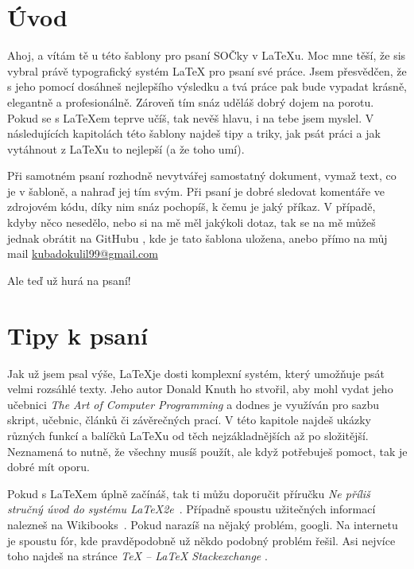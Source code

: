\documentclass[12pt, a4paper,
    twoside,        %
    openright
]{report}
\begin{document}
\pagestyle{fancy}
\setcounter{page}{1}

\chapter*{Úvod}
Ahoj,
a vítám tě u této šablony pro psaní SOČky v \LaTeX u. Moc mne těší, že sis vybral právě typografický systém \LaTeX{ }pro psaní své práce. Jsem přesvědčen, že s jeho pomocí dosáhneš nejlepšího výsledku a tvá práce pak bude vypadat krásně, elegantně a profesionálně. Zároveň tím snáz uděláš dobrý dojem na porotu. Pokud se s \LaTeX em teprve učíš, tak nevěš hlavu, i na tebe jsem myslel. V následujících kapitolách této šablony najdeš tipy a triky, jak psát práci a jak vytáhnout z \LaTeX u to nejlepší (a že toho umí).

Při samotném psaní rozhodně nevytvářej samostatný dokument, vymaž text, co je v šabloně, a nahraď jej tím svým. Při psaní je dobré sledovat komentáře ve zdrojovém kódu, díky nim snáz pochopíš, k čemu je jaký příkaz. V případě, kdyby něco nesedělo, nebo si na mě měl jakýkoli dotaz, tak se na mě můžeš jednak obrátit na GitHubu \cite{sablonaSOC}, kde je tato šablona uložena, anebo přímo na můj mail \url{kubadokulil99@gmail.com} %

Ale teď už hurá na psaní!

\chapter{Tipy k psaní}

Jak už jsem psal výše, \LaTeX je dosti komplexní systém, který umožňuje psát velmi rozsáhlé texty. Jeho autor Donald Knuth ho stvořil, aby mohl vydat jeho učebnici \emph{The Art of Computer Programming} a dodnes je využíván pro sazbu skript, učebnic, článků či závěrečných prací. V této kapitole najdeš ukázky různých funkcí a balíčků \LaTeX u od těch nejzákladnějších až po složitější. Neznamená to nutně, že všechny musíš použít, ale když potřebuješ pomoct, tak je dobré mít oporu.

Pokud s \LaTeX em úplně začínáš, tak ti můžu doporučit příručku \emph{Ne příliš stručný úvod do systému \LaTeX2e}~\cite{LaTeXprirucka}. Případně spoustu užitečných informací nalezneš na Wikibooks~\cite{wikibooksLaTeX}. Pokud narazíš na nějaký problém, googli. Na internetu je spoustu fór, kde pravděpodobně už někdo podobný problém řešil. Asi nejvíce toho najdeš na stránce \emph{TeX -- LaTeX Stackexchange} \cite{stackExchange}.
\end{document}
